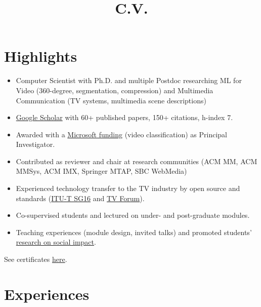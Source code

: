 \documentclass[10pt,a4paper,sans,colorlinks]{moderncv}
\title{C.V.}
\begin{document}
\setHyperrefBlueLinks
\makecvtitle
\vspace{-2em}

\section{Highlights}

\begin{itemize}
    \item Computer Scientist with Ph.D. and multiple Postdoc researching ML for Video (360-degree, segmentation, compression) and Multimedia Communication (TV systems, multimedia scene descriptions)
    \item \href{https://scholar.google.com/citations?user=1bEOmkUAAAAJ&hl=en}{Google Scholar} with 60+ published papers, 150+ citations, h-index 7.
    \item Awarded with a \href{https://www.rnp.br/en/rnp-and-microsoft-challenge-artificial-intelligence}{Microsoft funding} (video classification) as Principal Investigator.
    \item Contributed as reviewer and chair at research communities (ACM MM, ACM MMSys, ACM IMX, Springer MTAP, SBC WebMedia)
    \item Experienced technology transfer to the TV industry by open source and standards (\href{http://www.itu.int/en/ITU-T/studygroups/2022-2024/16}{ITU-T SG16} and \href{http://forumsbtvd.org.br}{TV Forum}).
    \item Co-supervised students and lectured on under- and post-graduate modules.
    \item Teaching experiences (module design, invited talks) and promoted students' \href{https://webmedia.org.br/2022/en/lf-award/}{research on social impact}.
\end{itemize}

See certificates \href{https://alanlivio.github.io/certificates.pdf}{here}.

\section{Experiences}
\end{document}
